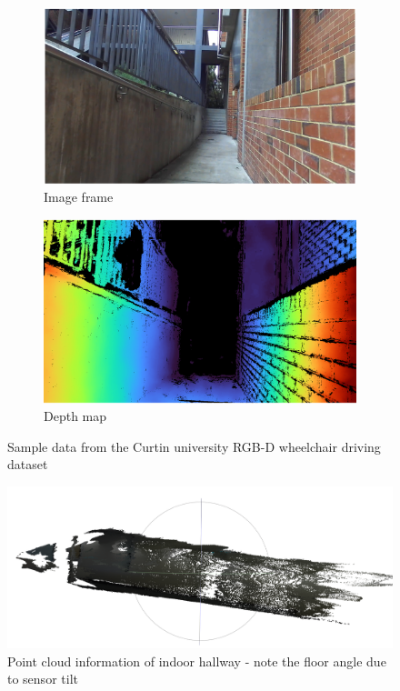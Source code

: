 \begin{figure}[H]
    \centering
    \begin{subfigure}{.48\textwidth}
        \centering
        \includegraphics[width=\linewidth]{images/zed_sample_image.png}
        \caption{Image frame}
    \end{subfigure}
    \quad
    \begin{subfigure}{.47\textwidth}
        \centering
        \includegraphics[width=\linewidth]{images/zed_sample_depth.png}
        \caption{Depth map}
    \end{subfigure}
    \caption{Sample data from the Curtin university RGB-D wheelchair driving dataset}
    \label{fig:zed_sample_dataset}
\end{figure}

\begin{figure}[H]
    \centering
    \includegraphics[width=0.7\linewidth]{images/meshlab_point_cloud.png}
    \caption{Point cloud information of indoor hallway - note the floor angle due to sensor tilt}
    \label{fig:meshlab_point_cloud}
\end{figure}

